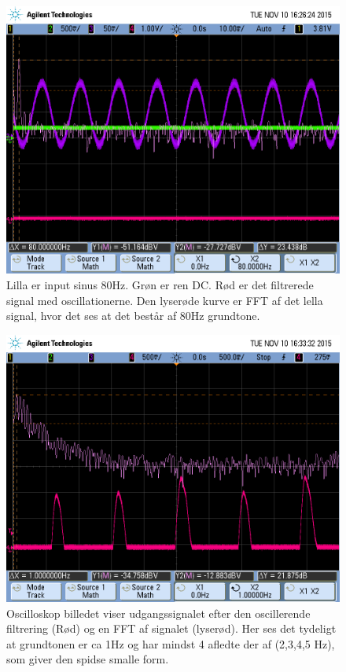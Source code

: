 \begin{figure}[H]
	\includegraphics[width=\textwidth]{Implementeringsdokument/billeder/scope_8.png}
	\caption{Lilla er input sinus 80Hz. Grøn er ren DC. Rød er det 	filtrerede signal med oscillationerne. Den lyserøde kurve er FFT af det lella signal, hvor det ses at det består af 80Hz grundtone.}\label{fig:filtertwo}
\end{figure}
\newpage

\begin{figure}[H]
	\includegraphics[width=\textwidth]{Implementeringsdokument/billeder/scope_10.png}
	\caption{Oscilloskop billedet viser udgangssignalet efter den oscillerende 	filtrering (Rød) og en FFT af signalet (lyserød). Her ses det tydeligt at grundtonen er ca 1Hz og har mindst 4 afledte der af 	(2,3,4,5 Hz), som giver den spidse smalle form.}\label{fig:filterthree}
\end{figure}

